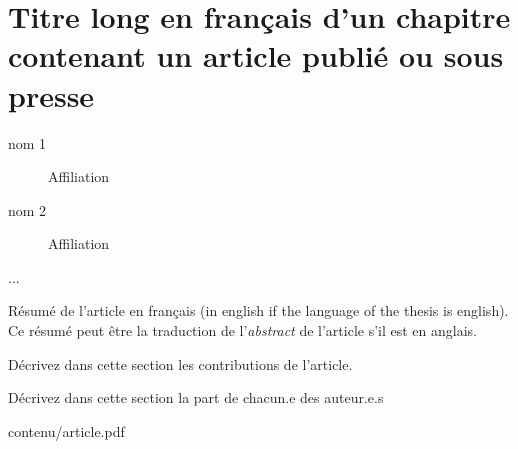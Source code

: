 \chapter[Article publié ou sous presse]
        {Titre long en français d'un chapitre contenant un article publié ou sous presse}
         \label{chap:publie}
        
\begin{authorsArticle}   %
	\begin{description}
		\item[\large nom 1] Affiliation
		\item[\large nom 2] Affiliation
		\item[\large ...] 
	\end{description}
\end{authorsArticle}

\begin{abstractArticle}
	Résumé de l'article en français (in english if the language of the thesis is english). Ce résumé peut être la traduction de l'\textit{abstract} de l'article s'il est en anglais.
\end{abstractArticle}

\begin{contributions}
	Décrivez dans cette section les contributions de l'article.
\end{contributions}
               
\begin{commentairesArticle}
	Décrivez dans cette section la part de chacun.e des auteur.e.s
\end{commentairesArticle}




{contenu/article.pdf} %

